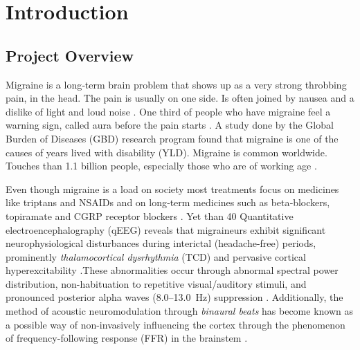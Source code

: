 \documentclass[12pt, a4paper]{report}
\begin{document}
\chapter{Introduction}
\label{ch:introduction}

\section{Project Overview}
\label{sec:project_overview}
Migraine is a long‑term brain problem that shows up as a very strong throbbing pain, in the head. The pain is usually on one side. Is often joined by nausea and a dislike of light and loud noise \cite{Zhang2023,VanDenHoek2024}. One third of people who have migraine feel a warning sign, called aura before the pain starts \cite{Riederer2023}. A study done by the Global Burden of Diseases (GBD) research program found that migraine is one of the causes of years lived with disability (YLD). Migraine is common worldwide. Touches than 1.1 billion people, especially those who are of working age \cite{Petrusic2025,DanelakisStubberud2025}.

Even though migraine is a load on society most treatments focus on medicines like triptans and NSAIDs and on long‑term medicines such as beta‑blockers, topiramate and CGRP receptor blockers \cite{Quartetti2025,Shamsi2024}. Yet than 40%
Quantitative electroencephalography (qEEG) reveals that migraineurs exhibit significant neurophysiological disturbances during interictal (headache-free) periods, prominently \textit{thalamocortical dysrhythmia} (TCD) and pervasive cortical hyperexcitability \cite{VanDenHoek2024,AbdulhusseinAldeen2024}.These abnormalities occur through abnormal spectral power distribution, non-habituation to repetitive visual/auditory stimuli, and pronounced posterior alpha waves (8.0--13.0~Hz) suppression \cite{chamanzar2021uhd,Zhang2023,FrimpongManson2024}. Additionally, the method of acoustic neuromodulation through \textit{binaural beats} has become known as a possible way of non-invasively influencing the cortex through the phenomenon of frequency-following response (FFR) in the brainstem \cite{Oster1973,Wahbeh2007,Ingendoh2023}.
\end{document}

